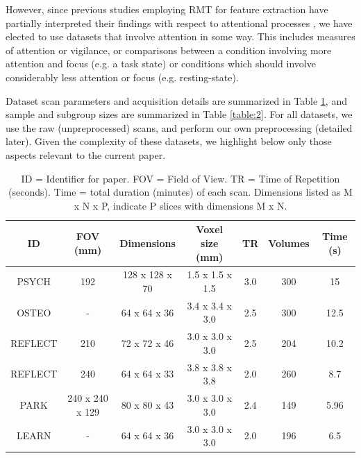 \documentclass[10pt]{article}
\begin{document}
However, since previous studies employing RMT for feature extraction have partially interpreted
their findings with respect to attentional processes
\citep{wangRandomMatrixTheory2016,matharooSpontaneousBackpainAlters2020}, we have elected to use
datasets that involve attention in some way. This includes measures of attention or vigilance, or
comparisons between a condition involving more attention and focus (e.g. a task state) or conditions
which should involve considerably less attention or focus (e.g. resting-state).

Dataset scan parameters and acquisition details are summarized in Table \ref{tab:1}, and sample
and subgroup sizes are summarized in Table \ref{table:2}. For all datasets, we use the raw
(unpreprocessed) scans, and perform our own preprocessing (detailed later). Given the complexity of
these datasets, we highlight below only those aspects relevant to the current paper.

\begin{table}[h!]
  \centering
  \begin{tabular}{ c c c c c c c }
  \hline
  \textbf{ID}  & \textbf{FOV (mm)}  & \textbf{Dimensions}  & \textbf{Voxel size (mm)} & \textbf{TR} & \textbf{Volumes} & \textbf{Time (s)} \\
  \hline
  PSYCH   &  192              & 128 x 128 x 70 & 1.5 x 1.5 x 1.5 & 3.0 & 300 & 15 \\
  OSTEO   &  -                & 64 x 64 x 36   & 3.4 x 3.4 x 3.0 & 2.5 & 300 & 12.5 \\
  REFLECT &  210              & 72 x 72 x 46   & 3.0 x 3.0 x 3.0 & 2.5 & 204 & 10.2 \\
  REFLECT &  240              & 64 x 64 x 33   & 3.8 x 3.8 x 3.8 & 2.0 & 260 & 8.7 \\
  PARK    &  240 x 240 x 129  & 80 x 80 x 43   & 3.0 x 3.0 x 3.0 & 2.4 & 149 & 5.96 \\
  LEARN   &  -                & 64 x 64 x 36   & 3.0 x 3.0 x 3.0 & 2.0 & 196 & 6.5 \\
  \hline
  \end{tabular}
  \caption{
      ID = Identifier for paper. FOV = Field of View. TR = Time of Repetition (seconds).
      Time = total duration (minutes) of each scan. Dimensions listed as M x N x P,
      indicate P slices with dimensions M x N.
  }
  \label{tab:1}
\end{table}
\end{document}
